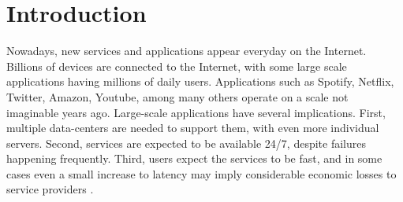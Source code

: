 
%

\chapter{Introduction}
\label{cha:introduction}






Nowadays, new services and applications appear everyday on the Internet.
Billions of devices are connected to the Internet, with some large scale applications having millions of daily users.
Applications such as Spotify, Netflix, Twitter, Amazon, Youtube, among many others operate on a scale not imaginable years ago.
Large-scale applications have several implications.
First, multiple data-centers are needed to support them, with even more individual servers.
Second, services are expected to be available 24/7, despite failures happening frequently.
Third, users expect the services to be fast, and in some cases even a small increase to latency may imply considerable economic losses to service providers \cite{???}.

